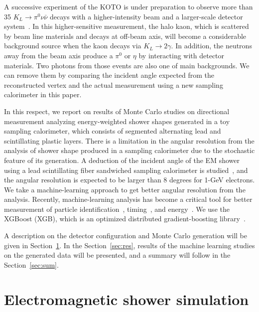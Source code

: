\documentclass[12pt,times,draftclsnofoot,a4paper]{elsarticle}
\begin{document}
A successive experiment of the KOTO is under preparation to observe more than 35 $K_{L} \rightarrow \pi^{0}\nu\bar{\nu}$ decays with a higher-intensity beam and a larger-scale detector system~\cite{KOTO2}. In this higher-sensitive measurement, the halo kaon, which is scattered by beam line materials and decays at off-beam axis, will become a considerable background source when the kaon decays via $K_{L} \rightarrow 2\gamma$. In addition, the neutrons away from the beam axis produce a $\pi^{0}$ or $\eta$ by interacting with detector materials. Two photons from those events are also one of main backgrounds. We can remove them by comparing the incident angle expected from the reconstructed vertex and the actual measurement using a new sampling calorimeter in this paper.

In this respect, we report on results of Monte Carlo studies on directional measurement analyzing energy-weighted shower shapes generated in a toy sampling calorimeter, which consists of segmented alternating lead and scintillating plastic layers. There is a limitation in the angular resolution from the analysis of shower shape produced in a sampling calorimeter due to the stochastic feature of its generation. A deduction of the incident angle of the EM shower using a lead scintillating fiber sandwiched sampling calorimeter is studied~\cite{PbScint}, and the angular resolution is expected to be larger than 8 degrees for 1-GeV electrons. We take a machine-learning approach to get better angular resolution from the analysis. Recently, machine-learning analysis has become a critical tool for better measurement of particle identification~\cite{mlp}, timing~\cite{mlt}, and energy~\cite{mle}. We use the XGBoost (XGB), which is an optimized distributed gradient-boosting library~\cite{xgboost:2016}.

A description on the detector configuration and Monte Carlo generation will be given in Section~\ref{sec:ems}. In the Section~\ref{sec:res}, results of the machine learning studies on the generated data will be presented, and a summary will follow in the Section~\ref{sec:sum}. 

\section{Electromagnetic shower simulation}
\label{sec:ems}
\end{document}
